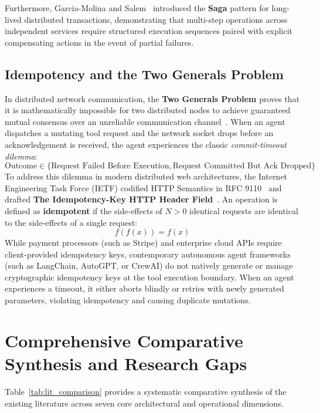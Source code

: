 Furthermore, Garcia-Molina and Salem~\cite{garciamolina1987sagas} introduced the \textbf{Saga} pattern for long-lived distributed transactions, demonstrating that multi-step operations across independent services require structured execution sequences paired with explicit compensating actions in the event of partial failures.

\subsection{Idempotency and the Two Generals Problem}
In distributed network communication, the \textbf{Two Generals Problem} proves that it is mathematically impossible for two distributed nodes to achieve guaranteed mutual consensus over an unreliable communication channel~\cite{tanenbaum2007distributed}. When an agent dispatches a mutating tool request and the network socket drops before an acknowledgement is received, the agent experiences the classic \textit{commit-timeout dilemma}:
\begin{equation}
    \text{Outcome} \in \{\text{Request Failed Before Execution}, \text{Request Committed But Ack Dropped}\}
\end{equation}
To address this dilemma in modern distributed web architectures, the Internet Engineering Task Force (IETF) codified HTTP Semantics in RFC 9110~\cite{rfc9110} and drafted \textbf{The Idempotency-Key HTTP Header Field}~\cite{dalal2022idempotency}. An operation is defined as \textbf{idempotent} if the side-effects of $N > 0$ identical requests are identical to the side-effects of a single request:
\begin{equation}
    f(f(x)) = f(x)
\end{equation}
While payment processors (such as Stripe) and enterprise cloud APIs require client-provided idempotency keys, contemporary autonomous agent frameworks (such as LangChain, AutoGPT, or CrewAI) do not natively generate or manage cryptographic idempotency keys at the tool execution boundary. When an agent experiences a timeout, it either aborts blindly or retries with newly generated parameters, violating idempotency and causing duplicate mutations.

\section{Comprehensive Comparative Synthesis and Research Gaps}
\label{sec:lit_synthesis}
Table~\ref{tab:lit_comparison} provides a systematic comparative synthesis of the existing literature across seven core architectural and operational dimensions.

